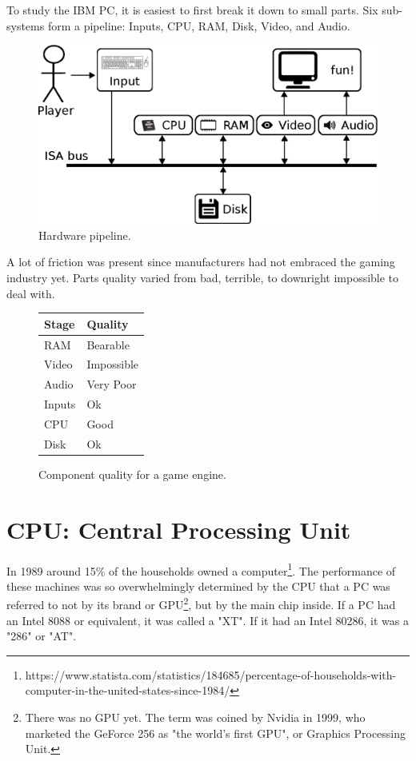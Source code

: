 \documentclass[book.tex]{subfiles}
\begin{document}
To study the IBM PC, it is easiest to first break it down to small parts. Six sub-systems form a pipeline: Inputs, CPU, RAM, Disk, Video, and Audio.\\
\begin{figure}[H]
\centering
\includegraphics[width=\textwidth]{imgs/drawings/fun_pipeline.eps}
\caption{Hardware pipeline.}
\label{fig:digraph}
\end{figure}

A lot of friction was present since manufacturers had not embraced the gaming industry yet. Parts quality varied from  bad, terrible, to downright impossible to deal with.\\
\par

\begin{figure}[H]
\centering
\begin{tabularx}{\textwidth}{ X X  }
  \toprule
  \textbf{Stage} & \textbf{Quality} \\ \bottomrule
  RAM & Bearable \\ 
  Video & Impossible \\ 
  Audio & Very Poor \\ 
  Inputs & Ok \\ 
  CPU & Good \\ 
  Disk & Ok \\ \bottomrule
\end{tabularx}
\caption{Component quality for a game engine.}
\end{figure}



\section{CPU: Central Processing Unit}

  In 1989 around 15\% of the households owned a computer\footnote{https://www.statista.com/statistics/184685/percentage-of-households-with-computer-in-the-united-states-since-1984/}. The performance of these machines was so overwhelmingly determined by the CPU that a PC was referred to not by its brand or GPU\footnote{There was no GPU yet. The term was coined by Nvidia in 1999, who marketed the GeForce 256 as "the world's first GPU", or Graphics Processing Unit.}, but by the main chip inside. If a PC had an Intel 8088 or equivalent, it was called a "XT". If it had an Intel 80286, it was a "286" or "AT".\\
\end{document}
